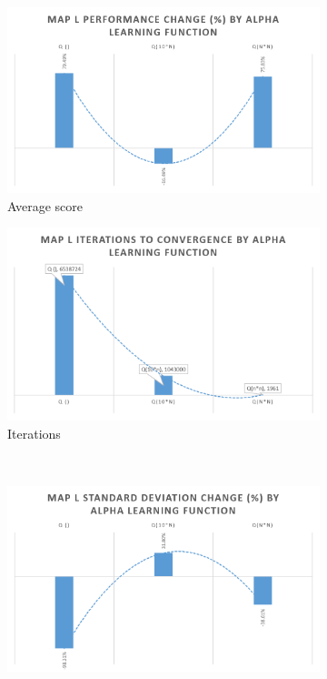 \documentclass[12pt, letter]{article}
\begin{document}
\begin{figure}[h!] 
\renewcommand\thesubfigure{\roman{subfigure}}
    \centering
    \begin{subfigure}[b]{0.48\textwidth}
        \includegraphics[width=1\textwidth]{img/L_Alpha/AvgScore}
        \caption{Average score}
    \end{subfigure}
    \begin{subfigure}[b]{0.48\textwidth}
        \includegraphics[width=1\textwidth]{img/L_Alpha/Iter}
        \caption{Iterations}
    \end{subfigure}
    \\
    \begin{subfigure}[b]{0.48\textwidth}
        \includegraphics[width=1\textwidth]{img/L_Alpha/StDev}

\end{subfigure}
\end{figure}
\end{document}

